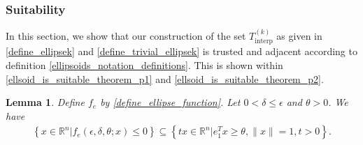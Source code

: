 \documentclass{article}
\newtheorem{lemma}[theorem]{Lemma}
\theoremstyle{case}
\numberwithin{theorem}{subsection}
\newcommand{\Rn}{\mathbb R^n}
\newcommand{\sampletrk}{{T_{\text{interp}}^{(k)}}}
\begin{document}
\subsubsection{Suitability}
\label{feasible_ellipsoid_analysis}

In this section, we show that our construction of the set $\sampletrk$ as given in 
\cref{define_ellipsek} and \cref{define_trivial_ellipsek}
is trusted and adjacent according to definition \cref{ellipsoids_notation_definitions}.
This is shown within \cref{ellsoid_is_suitable_theorem_p1} and \cref{ellsoid_is_suitable_theorem_p2}.

\begin{lemma}
\label{ellipse_in_cone}
Define $f_e$ by \cref{define_ellipse_function}.
Let $0 < \delta \le \epsilon$ and $\theta > 0$.
We have
\begin{align*}
\left\{x \in \Rn | f_e(\epsilon, \delta, \theta; x) \le 0\right\} \subseteq \left\{tx\in\Rn| e_1^T x \ge \theta,\|x\|=1, t>0\right\}.
\end{align*}
\end{lemma}
\end{document}
